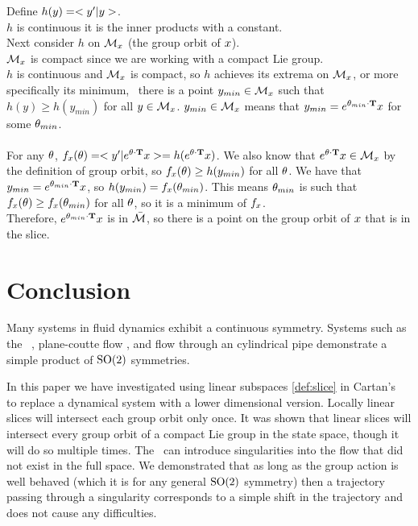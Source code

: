 {Define $h(y)=<{y'}|y>$.\\
$h$ is continuous it is the inner products with a constant.\\
Next consider $h$ on ${\cal M}_{x}$ (the group orbit of $x$).\\
${\cal M}_{x}$ is compact since we are working with a compact Lie group.\\
$h$ is continuous and ${\cal M}_{x}$ is compact, so $h$ achieves its extrema on ${\cal M}_{x}$, or more specifically its minimum, \ie\ there is a point $y_{min} \in {\cal M}_{x}$ such that $h(y)\geq h(y_{min})$ for all $y\in {\cal M}_{x}$. $y_{min} \in {\cal M}_{x}$ means that $y_{min}=e^{{\bf \theta}_{min} \cdot \mathbf{T}} x$ for some ${\bf \theta}_{min}$.\\
\\
For any ${\bf \theta}$, $f_{x}({\bf \theta})=<{y'}|e^{{\bf \theta} \cdot \mathbf{T}} x>=h(e^{{\bf \theta} \cdot \mathbf{T}} x)$. We also know that $e^{{\bf \theta} \cdot \mathbf{T}} x \in {\cal M}_{x}$ by the definition of group orbit, so $f_{x}({\bf \theta})\geq h(y_{min})$ for all ${\bf \theta}$. We have that $y_{min}=e^{{\bf \theta}_{min} \cdot \mathbf{T}} x$, so $h(y_{min})=f_{x}({\bf \theta}_{min})$.
This means ${\bf \theta}_{min}$ is such that $f_{x}({\bf \theta})\geq f_{x}({\bf \theta}_{min})$ for all ${\bf \theta}$, so it is a minimum of $f_{x}$.\\
Therefore, $e^{{\bf \theta}_{min}\cdot \mathbf{T}} x$ is in $\bar{{\cal M}}$, so there is a point on the group orbit of $x$ that is in the slice.\\

	\fi

\section{Conclusion}

Many systems in fluid dynamics exhibit a continuous symmetry. Systems such as the \KS\ , plane-coutte flow , and flow through an cylindrical pipe  demonstrate a simple product of $\textrm{SO}(2)$ symmetries.

In this paper we have investigated using linear subspaces \ref{def:slice} in Cartan's \mslices\  to replace a dynamical system with a lower dimensional version. Locally linear slices will intersect each group orbit only once. It was shown that linear slices will intersect every group orbit of a compact Lie group in the state space, though it will do so multiple times.
The \mslices\ can introduce singularities into the flow that did not exist in the full space. We demonstrated that as long as the group action is well behaved (which it is for any general $\textrm{SO}(2)$ symmetry) then a trajectory passing through a singularity corresponds to a simple shift in the trajectory and does not cause any difficulties.

}
